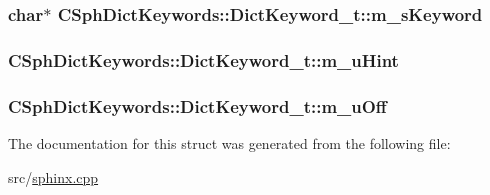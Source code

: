 \hypertarget{structCSphDictKeywords_1_1DictKeyword__t_a802c205970ee420b229c189a6cc8ab4c}{
\subsubsection[{m\-\_\-s\-Keyword}]{\setlength{\rightskip}{0pt plus 5cm}char$\ast$ C\-Sph\-Dict\-Keywords\-::\-Dict\-Keyword\-\_\-t\-::m\-\_\-s\-Keyword}}\label{structCSphDictKeywords_1_1DictKeyword__t_a802c205970ee420b229c189a6cc8ab4c}
\hypertarget{structCSphDictKeywords_1_1DictKeyword__t_ad45c2b7d50354aca0e2e4c7e60d1acb8}{
\subsubsection[{m\-\_\-u\-Hint}]{ C\-Sph\-Dict\-Keywords\-::\-Dict\-Keyword\-\_\-t\-::m\-\_\-u\-Hint}}\label{structCSphDictKeywords_1_1DictKeyword__t_ad45c2b7d50354aca0e2e4c7e60d1acb8}
\hypertarget{structCSphDictKeywords_1_1DictKeyword__t_add9e740560bc723c87f469b2851d9d55}{
\subsubsection[{m\-\_\-u\-Off}]{ C\-Sph\-Dict\-Keywords\-::\-Dict\-Keyword\-\_\-t\-::m\-\_\-u\-Off}}\label{structCSphDictKeywords_1_1DictKeyword__t_add9e740560bc723c87f469b2851d9d55}


The documentation for this struct was generated from the following file\-:\begin{DoxyCompactItemize}
\item 
src/\hyperlink{sphinx_8cpp}{sphinx.\-cpp}\end{DoxyCompactItemize}
